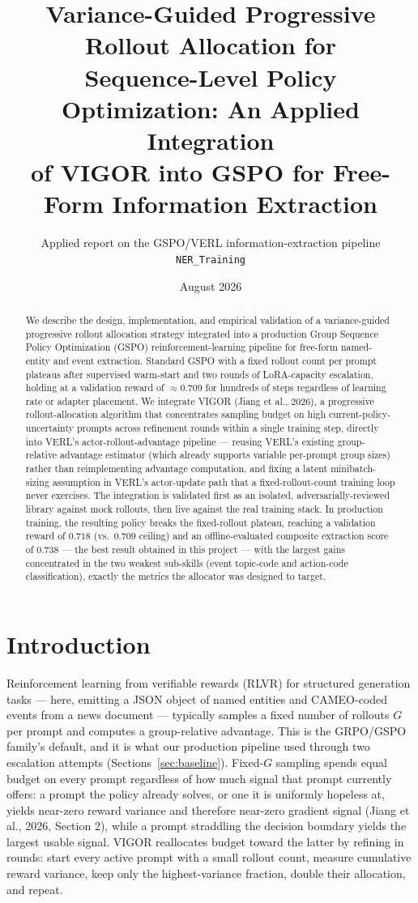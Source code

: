\documentclass[11pt]{article}
\title{Variance-Guided Progressive Rollout Allocation for\\
Sequence-Level Policy Optimization: An Applied Integration\\
of VIGOR into GSPO for Free-Form Information Extraction}
\author{Applied report on the GSPO/VERL information-extraction pipeline\\ \texttt{NER\_Training}}
\date{August 2026}
\begin{document}
\maketitle

\begin{abstract}
We describe the design, implementation, and empirical validation of a variance-guided
progressive rollout allocation strategy integrated into a production Group Sequence
Policy Optimization (GSPO) reinforcement-learning pipeline for free-form named-entity
and event extraction. Standard GSPO with a fixed rollout count per prompt plateaus
after supervised warm-start and two rounds of LoRA-capacity escalation, holding at a
validation reward of $\approx 0.709$ for hundreds of steps regardless of learning rate
or adapter placement. We integrate VIGOR (Jiang et al., 2026), a progressive
rollout-allocation algorithm that concentrates sampling budget on high
current-policy-uncertainty prompts across refinement rounds within a single training
step, directly into VERL's actor-rollout-advantage pipeline — reusing VERL's existing
group-relative advantage estimator (which already supports variable per-prompt group
sizes) rather than reimplementing advantage computation, and fixing a latent
minibatch-sizing assumption in VERL's actor-update path that a fixed-rollout-count
training loop never exercises. The integration is validated first as an isolated,
adversarially-reviewed library against mock rollouts, then live against the real
training stack. In production training, the resulting policy breaks the fixed-rollout
plateau, reaching a validation reward of $0.718$ (vs.\ $0.709$ ceiling) and an
offline-evaluated composite extraction score of $0.738$ — the best result obtained in
this project — with the largest gains concentrated in the two weakest sub-skills
(event topic-code and action-code classification), exactly the metrics the allocator
was designed to target.
\end{abstract}

\section{Introduction}

Reinforcement learning from verifiable rewards (RLVR) for structured generation tasks
— here, emitting a JSON object of named entities and CAMEO-coded events from a news
document — typically samples a fixed number of rollouts $G$ per prompt and computes a
group-relative advantage. This is the GRPO/GSPO family's default, and it is what our
production pipeline used through two escalation attempts (Sections~\ref{sec:baseline}).
Fixed-$G$ sampling spends equal budget on every prompt regardless of how much signal
that prompt currently offers: a prompt the policy already solves, or one it is
uniformly hopeless at, yields near-zero reward variance and therefore near-zero
gradient signal (Jiang et al., 2026, Section 2), while a prompt straddling the
decision boundary yields the largest usable signal. VIGOR reallocates budget toward
the latter by refining in rounds: start every active prompt with a small rollout
count, measure cumulative reward variance, keep only the highest-variance fraction,
double their allocation, and repeat.
\end{document}
